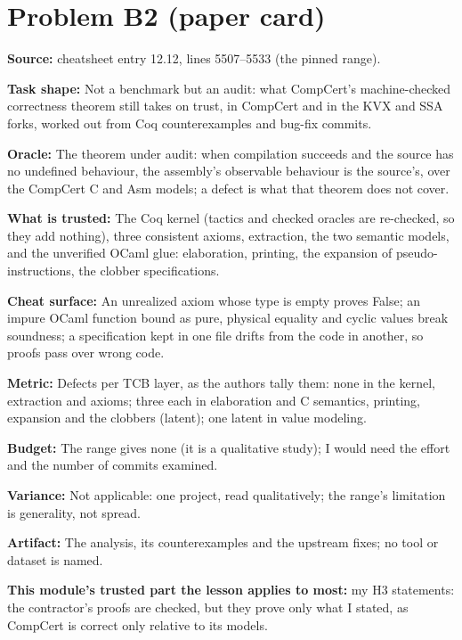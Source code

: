 \documentclass[11pt]{article}
\begin{document}
\section*{Problem B2 (paper card)}\label{ans:B2}
\begin{answer}
\textbf{Source:} cheatsheet entry 12.12, lines 5507--5533 (the pinned range).

\textbf{Task shape:} Not a benchmark but an audit: what CompCert's machine-checked
correctness theorem still takes on trust, in CompCert and in the KVX and SSA
forks, worked out from Coq counterexamples and bug-fix commits.

\textbf{Oracle:} The theorem under audit: when compilation succeeds and the source
has no undefined behaviour, the assembly's observable behaviour is the
source's, over the CompCert C and Asm models; a defect is what that theorem
does not cover.

\textbf{What is trusted:} The Coq kernel (tactics and checked oracles are re-checked,
so they add nothing), three consistent axioms, extraction, the two semantic
models, and the unverified OCaml glue: elaboration, printing, the expansion of
pseudo-instructions, the clobber specifications.

\textbf{Cheat surface:} An unrealized axiom whose type is empty proves False; an
impure OCaml function bound as pure, physical equality and cyclic values break
soundness; a specification kept in one file drifts from the code in another, so
proofs pass over wrong code.

\textbf{Metric:} Defects per TCB layer, as the authors tally them: none in the
kernel, extraction and axioms; three each in elaboration and C semantics,
printing, expansion and the clobbers (latent); one latent in value modeling.

\textbf{Budget:} The range gives none (it is a qualitative study); I would need the
effort and the number of commits examined.

\textbf{Variance:} Not applicable: one project, read qualitatively; the range's
limitation is generality, not spread.

\textbf{Artifact:} The analysis, its counterexamples and the upstream fixes; no tool
or dataset is named.

\textbf{This module's trusted part the lesson applies to most:} my H3 statements: the
contractor's proofs are checked, but they prove only what I stated, as CompCert
is correct only relative to its models.
\end{answer}
\end{document}
